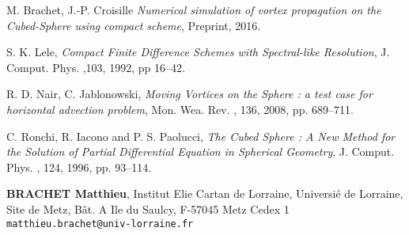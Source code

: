 \documentclass[10pt]{article}
\def\auteurenbasdepage#1#2#3{\small{\bf #1}, \small{#2}\\ \small{\tt #3}\\ }
\begin{document}

\begin{thebibliography}{99}

 {\sc M. Brachet, J.-P. Croisille} {\sl Numerical simulation of vortex propagation on the Cubed-Sphere using compact scheme}, Preprint, 2016.

 {\sc S. K. Lele}, {\sl Compact Finite Difference Schemes with Spectral-like Resolution}, J. Comput. Phys. ,103, 1992, pp 16--42.

 {\sc R. D. Nair, C. Jablonowski}, {\sl Moving Vortices on the Sphere : a test case for horizontal advection problem}, Mon. Wea. Rev. , 136, 2008, pp. 689--711.

 {\sc C. Ronchi, R. Iacono and P. S. Paolucci}, {\sl The Cubed Sphere : A New Method for the Solution of Partial Differential Equation in Spherical Geometry}, J. Comput. Phys. , 124, 1996, pp. 93--114.

\end{thebibliography}
%
\vfill
\auteurenbasdepage{BRACHET Matthieu}{Institut Elie Cartan de Lorraine, Universi\'e de Lorraine,
Site de Metz, B\^at.  A Ile du Saulcy, F-57045 Metz Cedex 1}{matthieu.brachet@univ-lorraine.fr}
%
\end{document}
